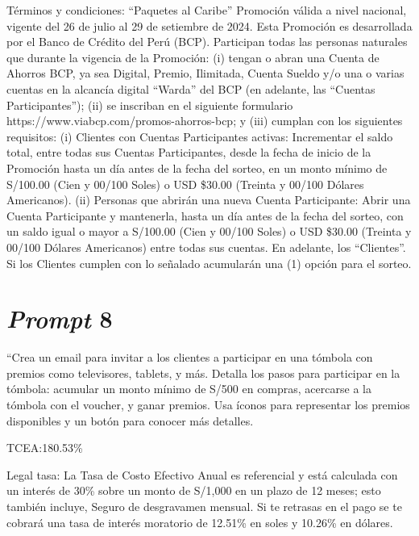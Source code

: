 Términos y condiciones: “Paquetes al Caribe” Promoción válida a nivel nacional, vigente del 26 de julio al 29 de setiembre de 2024. Esta Promoción es desarrollada por el Banco de Crédito del Perú (BCP). Participan todas las personas naturales que durante la vigencia de la Promoción: (i) tengan o abran una Cuenta de Ahorros BCP, ya sea Digital, Premio, Ilimitada, Cuenta Sueldo y/o una o varias cuentas en la alcancía digital “Warda” del BCP (en adelante, las “Cuentas Participantes”); (ii) se inscriban en el siguiente formulario https://www.viabcp.com/promos-ahorros-bcp; y (iii) cumplan con los siguientes requisitos: (i) Clientes con Cuentas Participantes activas: Incrementar el saldo total, entre todas sus Cuentas Participantes, desde la fecha de inicio de la Promoción hasta un día antes de la fecha del sorteo, en un monto mínimo de S/100.00 (Cien y 00/100 Soles) o USD \$30.00 (Treinta y 00/100 Dólares Americanos). (ii) Personas que abrirán una nueva Cuenta Participante: Abrir una Cuenta Participante y mantenerla, hasta un día antes de la fecha del sorteo, con un saldo igual o mayor a S/100.00 (Cien y 00/100 Soles) o USD \$30.00 (Treinta y 00/100 Dólares Americanos) entre todas sus cuentas. En adelante, los “Clientes”. Si los Clientes cumplen con lo señalado acumularán una (1) opción para el sorteo. 

\section{\textit{Prompt} 8}

``Crea un email para invitar a los clientes a participar en una tómbola con premios como televisores, tablets, y más. Detalla los pasos para participar en la tómbola: acumular un monto mínimo de S/500 en compras, acercarse a la tómbola con el voucher, y ganar premios. Usa íconos para representar los premios disponibles y un botón para conocer más detalles.

TCEA:180.53\%

Legal tasa: La Tasa de Costo Efectivo Anual es referencial y está calculada con un interés de 30\% sobre un monto de S/1,000 en un plazo de 12 meses; esto también incluye, Seguro de desgravamen mensual. Si te retrasas en el pago se te cobrará una tasa de interés moratorio de 12.51\% en soles y 10.26\% en dólares.

